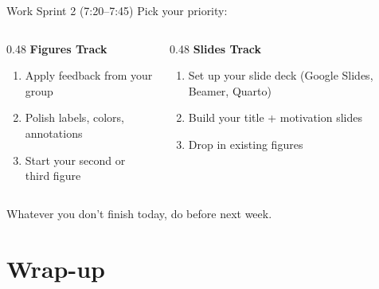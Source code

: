 \begin{frame}{Work Sprint 2 (7:20--7:45)}
  Pick your priority:

  \vspace{8pt}

  \begin{columns}[T]
    \begin{column}{0.48\textwidth}
      \textbf{\textcolor{usfgreen}{Figures Track}}
      \begin{enumerate}
        \item Apply feedback from your group
        \item Polish labels, colors, annotations
        \item Start your second or third figure
      \end{enumerate}
    \end{column}
    \begin{column}{0.48\textwidth}
      \textbf{\textcolor{usfgreen}{Slides Track}}
      \begin{enumerate}
        \item Set up your slide deck (Google Slides, Beamer, Quarto)
        \item Build your title + motivation slides
        \item Drop in existing figures
      \end{enumerate}
    \end{column}
  \end{columns}

  \vspace{10pt}

  Whatever you don't finish today, do before next week.
\end{frame}

\section{Wrap-up}

